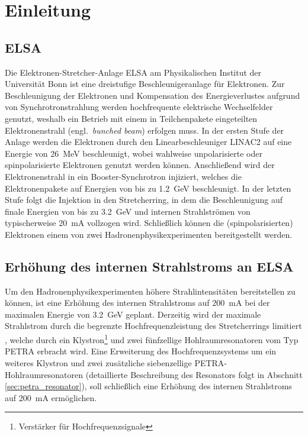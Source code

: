 \chapter{Einleitung}
\label{sec:einleitung}

\section{ELSA}
Die Elektronen-Stretcher-Anlage ELSA am Physikalischen Institut der Universität Bonn ist eine dreistufige Beschleunigeranlage für Elektronen.
Zur Beschleunigung der Elektronen und Kompensation des Energieverlustes aufgrund von Synchrotronstrahlung werden hochfrequente elektrische Wechselfelder genutzt, weshalb ein Betrieb mit einem in Teilchenpakete eingeteilten Elektronenstrahl (engl.\ \textit{bunched beam}) erfolgen muss.
In der ersten Stufe der Anlage werden die Elektronen durch den Linearbeschleuniger LINAC2 auf eine Energie von \SI{26}{MeV} beschleunigt, wobei wahlweise unpolarisierte oder spinpolarisierte Elektronen genutzt werden können.
Anschließend wird der Elektronenstrahl in ein Booster-Synchrotron injiziert, welches die Elektronenpakete auf Energien von bis zu \SI{1.2}{GeV} beschleunigt.
In der letzten Stufe folgt die Injektion in den Stretcherring, in dem die Beschleunigung auf finale Energien von bis zu \SI{3.2}{GeV} und internen Strahlströmen von typischerweise \SI{20}{mA} vollzogen wird.
Schließlich können die (spinpolarisierten) Elektronen einem von zwei Hadronenphysikexperimenten bereitgestellt werden.


\section{Erhöhung des internen Strahlstroms an ELSA}
Um den Hadronenphysikexperimenten höhere Strahlintensitäten bereitstellen zu können, ist eine Erhöhung des internen Strahlstroms auf \SI{200}{mA} bei der maximalen Energie von \SI{3.2}{GeV} geplant.
Derzeitig wird der maximale Strahlstrom durch die begrenzte Hochfrequenzleistung des Stretcherrings limitiert \cite{schedler}, welche durch ein Klystron\footnote{Verstärker für Hochfrequenzsignale} und zwei fünfzellige Hohlraumresonatoren vom Typ PETRA erbracht wird.
Eine Erweiterung des Hochfrequenzsystems um ein weiteres Klystron und zwei zusätzliche siebenzellige PETRA-Hohlraumresonatoren (detaillierte Beschreibung des Resonators folgt in Abschnitt \ref{sec:petra_resonator}), soll schließlich eine Erhöhung des internen Strahlstroms auf \SI{200}{mA} ermöglichen.

